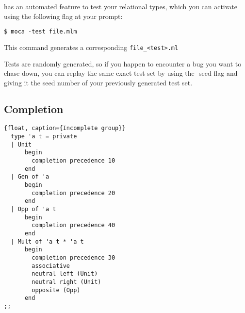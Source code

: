 \moca has an automated feature to test your relational types, which
you can activate using the following flag at your prompt:
\begin{verbatim}
$ moca -test file.mlm
\end{verbatim}

This command generates a corresponding \verb£file_<test>.ml£

Tests are randomly generated, so if you happen to encounter a bug you
want to chase down, you can replay the same exact test set by using
the {\sf -seed} flag and giving it the seed number of your previously
generated test set.



\subsection{Completion}
\label{sec:comp}

\begin{lstlisting}{float, caption={Incomplete group}}
  type 'a t = private
  | Unit
      begin
        completion precedence 10
      end
  | Gen of 'a
      begin
        completion precedence 20
      end
  | Opp of 'a t
      begin
        completion precedence 40
      end
  | Mult of 'a t * 'a t
      begin
        completion precedence 30
        associative
        neutral left (Unit)
        neutral right (Unit)
        opposite (Opp)
      end
;;
\end{lstlisting}
